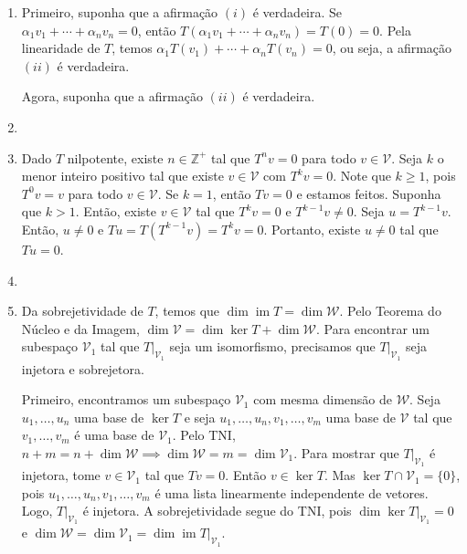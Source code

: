\documentclass[12pt]{article}
\DeclareMathOperator{\im}{im}
\begin{document}
\begin{enumerate}
\begin{enumerate}
            \item[(d)]
        \end{enumerate}
    \item[\textbf{E6}] Primeiro, suponha que a afirmação \((i)\) é verdadeira. Se \(\alpha_1 v_1 + \cdots + \alpha_n v_n = 0\), então \(T(\alpha_1 v_1 + \cdots + \alpha_n v_n) = T(0) = 0\). Pela linearidade de \(T\), temos \(\alpha_1 T(v_1) + \cdots + \alpha_n T(v_n) = 0\), ou seja, a afirmação \((ii)\) é verdadeira.
    
    Agora, suponha que a afirmação \((ii)\) é verdadeira. 
    \item[\textbf{E7}] 
    \item[\textbf{E8}] Dado \(T\) nilpotente, existe \(n \in \mathbb{Z}^{+}\) tal que \(T^n v=0\) para todo \(v \in \mathcal{V}\). Seja \(k\) o menor inteiro positivo tal que existe \(v \in \mathcal{V}\) com \(T^k v = 0\). Note que \(k \geq 1\), pois \(T^0 v = v\) para todo \(v \in \mathcal{V}\). Se \(k=1\), então \(T v = 0\) e estamos feitos. Suponha que \(k > 1\). Então, existe \(v \in \mathcal{V}\) tal que \(T^k v = 0\) e \(T^{k-1} v \neq 0\). Seja \(u = T^{k-1} v\). Então, \(u \neq 0\) e \(T u = T(T^{k-1} v) = T^k v = 0\). Portanto, existe \(u \neq 0\) tal que \(T u = 0\).
    \item[\textbf{E9}] 
    \item[\textbf{E10}] Da sobrejetividade de \(T\), temos que \(\dim \im T = \dim \mathcal{W}\). Pelo Teorema do Núcleo e da Imagem, \(\dim \mathcal{V} = \dim \ker T + \dim \mathcal{W}\). 
    Para encontrar um subespaço \(\mathcal{V}_1\) tal que \(T\vert_{\mathcal{V}_1}\) seja um isomorfismo, precisamos que \(T\vert_{\mathcal{V}_1}\) seja injetora e sobrejetora.

    Primeiro, encontramos um subespaço \(\mathcal{V}_1\) com mesma dimensão de \(\mathcal{W}\). Seja \(u_1, \ldots, u_n\) uma base de \(\ker T\) e seja \(u_1, \ldots, u_n, v_1, \ldots, v_m\) uma base de \(\mathcal{V}\) tal que \(v_1, \ldots, v_m\) é uma base de \(\mathcal{V}_1\).
    Pelo TNI, \(n+m = n+\dim \mathcal{W} \implies \dim \mathcal{W} = m = \dim \mathcal{V}_1\). Para mostrar que \(T\vert_{\mathcal{V}_1}\) é injetora, tome \(v \in \mathcal{V}_1\) tal que \(Tv=0\).
    Então \(v \in \ker T\). Mas \(\ker T \cap \mathcal{V}_1 = \{0\}\), pois \(u_1, \ldots, u_n, v_1, \ldots, v_m\) é uma lista linearmente independente de vetores. Logo, \(T\vert_{\mathcal{V}_1}\) é injetora.
    A sobrejetividade segue do TNI, pois \(\dim \ker T\vert_{\mathcal{V}_1} = 0\) e \(\dim \mathcal{W} = \dim \mathcal{V}_1 = \dim \im T\vert_{\mathcal{V}_1}\).


\end{enumerate}
\end{document}
